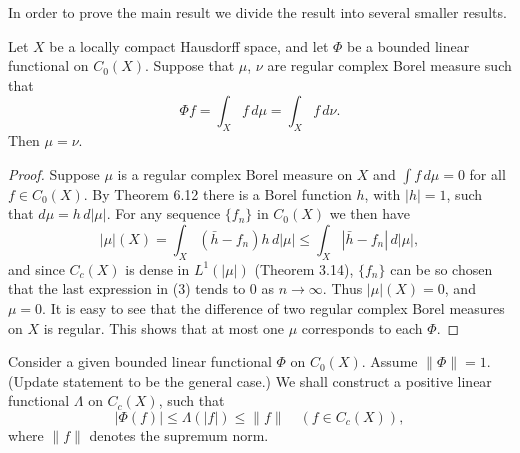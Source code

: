In order to prove the main result we divide the result into several smaller results.

\begin{lemma}
  \label{lem:rieszMeasure_unique}
  Let $X$ be a locally compact Hausdorff space, and let $\Phi$ be a bounded linear functional on $C_0(X)$.
  Suppose that $\mu$, $\nu$ are regular complex Borel measure such that
  \begin{equation*}
    \Phi f = \int_X f \, d\mu = \int_X f \, d\nu.
  \end{equation*}
  Then \(\mu = \nu\).
\end{lemma}

\begin{proof}
  Suppose $\mu$ is a regular complex Borel measure on $X$ and $\int f \, d\mu = 0$ for all $f \in C_0(X)$.
  By Theorem 6.12 there is a Borel function $h$, with $|h| = 1$, such that $d\mu = h \, d|\mu|$.
  For any sequence $\{f_n\}$ in $C_0(X)$ we then have
  \begin{equation}
    |\mu|(X) = \int_X (\bar{h} - f_n)h \, d|\mu| \leq \int_X |\bar{h} - f_n| \, d|\mu|, \tag{3}
  \end{equation}
  and since $C_c(X)$ is dense in $L^1(|\mu|)$ (Theorem 3.14), $\{f_n\}$ can be so chosen that the last expression in (3) tends to 0 as $n \to \infty$.
  Thus $|\mu|(X) = 0$, and $\mu = 0$.
  It is easy to see that the difference of two regular complex Borel measures on $X$ is regular.
  This shows that at most one $\mu$ corresponds to each $\Phi$.
\end{proof}


\begin{lemma}
  \label{lem:exists_pos_lin_func}
  Consider a given bounded linear functional $\Phi$ on $C_0(X)$.
  Assume $\|\Phi\| = 1$. (Update statement to be the general case.)
  We shall construct a positive linear functional $\Lambda$ on $C_c(X)$, such that
  \begin{equation}
    |\Phi(f)| \leq \Lambda(|f|) \leq \|f\| \quad (f \in C_c(X)), \tag{4}
  \end{equation}
  where $\|f\|$ denotes the supremum norm.
\end{lemma}

